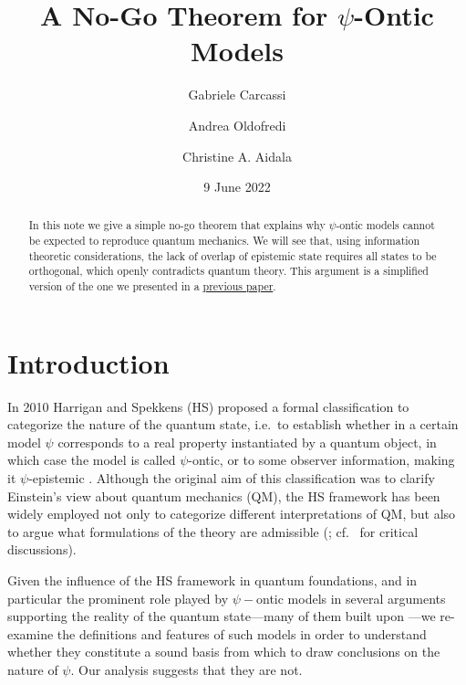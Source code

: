 \documentclass[10pt,twocolumn, nofootinbib]{revtex4-1}
\begin{document}
\title{A No-Go Theorem for $\psi$-Ontic Models}
\author{Gabriele Carcassi}
\author{Andrea Oldofredi}
\author{Christine A. Aidala}

\date{9 June 2022}


\begin{abstract}
In this note we give a simple no-go theorem that explains why $\psi$-ontic models cannot be expected to reproduce quantum mechanics. We will see that, using information theoretic considerations, the lack of overlap of epistemic state requires all states to be orthogonal, which openly contradicts quantum theory. This argument is a simplified version of the one we presented in a \href{https://arxiv.org/pdf/2201.11842.pdf}{previous paper}.
\end{abstract}

\maketitle

\section{Introduction}
In 2010 Harrigan and Spekkens (HS) proposed a formal classification to categorize the nature of the quantum state, i.e.\ to establish whether in a certain model $\psi$ corresponds to a real property instantiated by a quantum object, in which case the model is called $\psi$-ontic, or to some observer information, making it $\psi$-epistemic \cite{Harrigan:2010}. Although the original aim of this classification was to clarify Einstein's view about quantum mechanics (QM), the HS framework has been widely employed not only to categorize different interpretations of QM, but also to argue what formulations of the theory are admissible (\cite{PBR:2012, Leifer:2013, Leifer:2017, Branciard:2014, Hermens:2021, Wood:2015, Ringbauer:2015, Mazurek:2016, Bartlett:2012}; cf.\ \cite{Oldofredi:2020b, Lewis:2012, Ladyman:2021} for critical discussions). 

Given the influence of the HS framework in quantum foundations, and in particular the prominent role played by $\psi-$ontic models in several arguments supporting the reality of the quantum state---many of them built upon \cite{PBR:2012}---we re-examine the definitions and features of such models in order to understand whether they constitute a sound basis from which to draw conclusions on the nature of $\psi$. Our analysis suggests that they are not.
\end{document}
